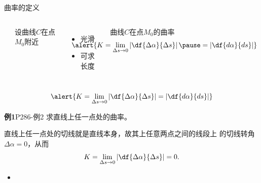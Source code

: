 \begin{frame}{曲率的定义}
	\linespread{1.5}
	\pause
	
	\vspace{1em}
	\begin{columns}
			\begin{center}
			\end{center}
			\pause 
			设曲线$C$在点$M_0$附近\pause 
			\begin{itemize}
			  \item 光滑\pause 
			  \item 可求长度\pause 
			\end{itemize}
			{\bb 曲线$C$在点$M_0$的曲率}
			$$\hspace{-2cm}\alert{K=\lim\limits_{\Delta s\to
				0}\left|\df{\Delta\alpha}{\Delta s}\right|\pause
				=\left|\df{d\alpha}{ds}\right|}$$
	\end{columns}
\end{frame}

\begin{frame}
	\linespread{1.2} 
	$$\alert{K=\lim\limits_{\Delta s\to
				0}\left|\df{\Delta\alpha}{\Delta s}\right|
				=\left|\df{d\alpha}{ds}\right|}$$ 
	\begin{exampleblock}{{\bf 例1}\hfill P286-例2}
		求直线上任一点处的曲率。
	\end{exampleblock}
	直线上任一点处的切线就是直线本身\pause ，故其上任意两点之间的线段上
	的切线转角$\Delta\alpha=0$，\pause 从而
	$$K=\lim\limits_{\Delta s\to 0}\left|
	\df{\Delta\alpha}{\Delta s}\right|=0.$$
	\vspace{-1em}
	\begin{itemize}\pause 
	  \item {}
	\end{itemize}
\end{frame}

